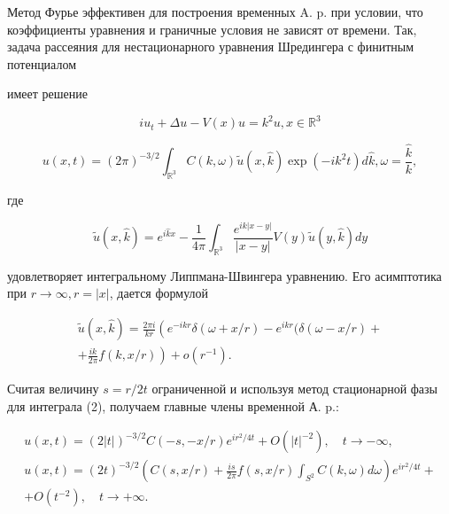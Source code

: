 \documentclass[10pt]{article}
\begin{document}
Метод Фурье эффективен для построения временных A. p. при условии, что коэффициенты уравнения и граничные условия не зависят от времени. Так, задача рассеяния для нестационарного уравнения Шредингера с финитным потенциалом



имеет решение



\[

i u_{t}+\Delta u-V(x) u=k^{2} u, x \in \mathbb{R}^{3}

\]



\[

u(x, t)=(2 \pi)^{-3 / 2} \int_{\mathbb{R}^{3}} C(k, \omega) \tilde{u}(x, \hat{k}) \exp \left(-i k^{2} t\right) d \hat{k}, \omega=\frac{\hat{k}}{k},

\]



где



\[

\tilde{u}(x, \hat{k})=e^{i \hat{k} x}-\frac{1}{4 \pi} \int_{\mathbb{R}^{3}} \frac{e^{i k|x-y|}}{|x-y|} V(y) \tilde{u}(y, \hat{k}) d y

\]



удовлетворяет интегральному Липпмана-Швингера уравнению. Его асимптотика при $r \rightarrow \infty, r=|x|$, дается формулой



\[

\begin{gathered}

\tilde{u}(x, \hat{k})=\frac{2 \pi i}{k r}\left(e^{-i k r} \delta(\omega+x / r)-e^{i k r}(\delta(\omega-x / r)+\right. \\

\left.+\frac{i k}{2 \pi} f(k, x / r)\right)+o\left(r^{-1}\right) .

\end{gathered}

\]



Считая величину $s=r / 2 t$ ограниченной и используя метод стационарной фазы для интеграла (2), получаем главные члены временной А. p.:



\[

\begin{gathered}

u(x, t)=(2|t|)^{-3 / 2} C(-s,-x / r) e^{i r^{2} / 4 t}+O\left(|t|^{-2}\right), \quad t \rightarrow-\infty, \\

u(x, t)=(2 t)^{-3 / 2}\left(C(s, x / r)+\frac{i s}{2 \pi} f(s, x / r) \int_{S^{2}} C(k, \omega) d \omega\right) e^{i r^{2} / 4 t}+ \\

+O\left(t^{-2}\right), \quad t \rightarrow+\infty .

\end{gathered}

\]
\end{document}
